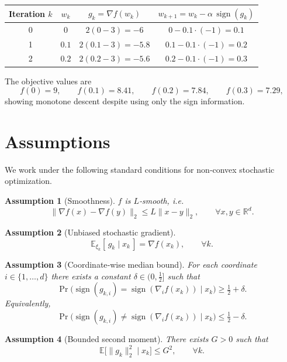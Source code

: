 \documentclass{article}
\newtheorem{assumption}{Assumption}
\newcommand{\E}{\mathbb{E}}
\newcommand{\R}{\mathbb{R}}
\begin{document}
\begin{center}
\begin{tabular}{c|c|c|c}
Iteration $k$ & $w_k$ & $g_k=\nabla f(w_k)$ & $w_{k+1}=w_k-\alpha\,\operatorname{sign}(g_k)$\\\hline
0 & $0$ & $2(0-3)=-6$ & $0-0.1\cdot(-1)=0.1$\\
1 & $0.1$ & $2(0.1-3)=-5.8$ & $0.1-0.1\cdot(-1)=0.2$\\
2 & $0.2$ & $2(0.2-3)=-5.6$ & $0.2-0.1\cdot(-1)=0.3$
\end{tabular}
\end{center}
The objective values are
\[
f(0)=9,\qquad f(0.1)=8.41,\qquad f(0.2)=7.84,\qquad f(0.3)=7.29,
\]
showing monotone descent despite using only the sign information.

\newpage
\section*{Assumptions}
We work under the following standard conditions for non‑convex stochastic optimization.

\begin{assumption}[Smoothness]\label{ass:smooth}
$f$ is $L$‑smooth, i.e.
\[
\|\nabla f(x)-\nabla f(y)\|_2\le L\|x-y\|_2,\qquad\forall x,y\in\R^{d}.
\]
\end{assumption}

\begin{assumption}[Unbiased stochastic gradient]\label{ass:unbiased}
\[
\E_{\xi_k}[\,g_k\mid x_k\,]=\nabla f(x_k),\qquad\forall k.
\]
\end{assumption}

\begin{assumption}[Coordinate‑wise median bound]\label{ass:median}
For each coordinate $i\in\{1,\dots,d\}$ there exists a constant $\delta\in(0,\tfrac12]$ such that
\[
\Pr\bigl(\operatorname{sign}(g_{k,i})=\operatorname{sign}(\nabla_i f(x_k))\mid x_k\bigr)\ge \tfrac12+\delta .
\]
Equivalently,
\[
\Pr\bigl(\operatorname{sign}(g_{k,i})\neq\operatorname{sign}(\nabla_i f(x_k))\mid x_k\bigr)\le \tfrac12-\delta .
\]
\end{assumption}

\begin{assumption}[Bounded second moment]\label{ass:bounded}
There exists $G>0$ such that
\[
\E\bigl[\|g_k\|_2^2\mid x_k\bigr]\le G^2,\qquad\forall k.
\]
\end{assumption}
\end{document}
